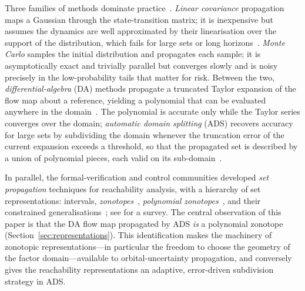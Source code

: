 \documentclass[11pt]{article}
\begin{document}
Three families of methods dominate practice~\citep{luo2017review}. \emph{Linear
covariance} propagation maps a Gaussian through the state-transition matrix; it
is inexpensive but assumes the dynamics are well approximated by their
linearisation over the support of the distribution, which fails for large sets
or long horizons~\citep{junkins1996non}. \emph{Monte Carlo} samples the initial
distribution and propagates each sample; it is asymptotically exact and
trivially parallel but converges slowly and is noisy precisely in the
low-probability tails that matter for risk. Between the two,
\emph{differential-algebra} (DA) methods propagate a truncated Taylor expansion
of the flow map about a reference, yielding a polynomial that can be evaluated
anywhere in the domain~\citep{berz1999modern, dilizia2008application,
armellin2010asteroid, valli2013nonlinear}. The polynomial is accurate only while
the Taylor series converges over the domain; \emph{automatic domain splitting}
(ADS) recovers accuracy for large sets by subdividing the domain whenever the
truncation error of the current expansion exceeds a threshold, so that the
propagated set is described by a union of polynomial pieces, each valid on its
sub-domain~\citep{wittig2015propagation, losacco2024low}.

In parallel, the formal-verification and control communities developed
\emph{set propagation} techniques for reachability analysis, with a hierarchy of
set representations: intervals, \emph{zonotopes}~\citep{girard2005reachability},
\emph{polynomial zonotopes}~\citep{althoff2013reachability,
kochdumper2021sparse}, and their constrained
generalisations~\citep{scott2016constrained, kochdumper2023constrained}; see
\citet{althoff2021set} for a survey. The central observation of this paper is
that the DA flow map propagated by ADS \emph{is} a polynomial zonotope
(Section~\ref{sec:representations}). This identification makes the machinery of
zonotopic representations---in particular the freedom to choose the geometry of
the factor domain---available to orbital-uncertainty propagation, and conversely
gives the reachability representations an adaptive, error-driven subdivision
strategy in ADS.
\end{document}
